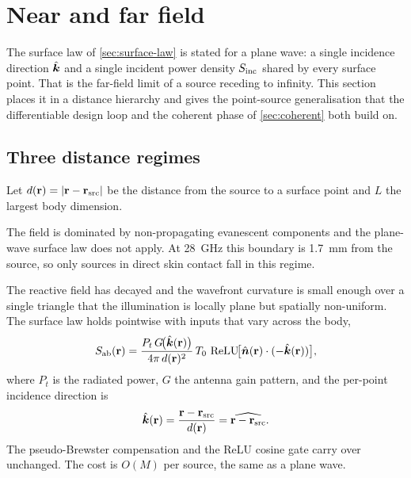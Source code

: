 \section{Near and far field}\label{sec:nearfar}

The surface law of \cref{sec:surface-law} is stated for a plane wave: a
single incidence direction $\hat{\bm{k}}$ and a single incident power density
$S_{\mathrm{inc}}$ shared by every surface point. That is the far-field limit of a
source receding to infinity. This section places it in a distance
hierarchy and gives the point-source generalisation that the
differentiable design loop and the coherent phase of \cref{sec:coherent}
both build on.

\subsection{Three distance regimes}

Let $d(\mathbf{r})=\abs{\mathbf{r}-\mathbf{r}_{\mathrm{src}}}$ be the distance from the
source to a surface point and $L$ the largest body dimension.

\begin{definition}\label{def:reactive}
The field is dominated by non-propagating evanescent components and the
plane-wave surface law does not apply. At \SI{28}{\giga\hertz} this
boundary is \SI{1.7}{\milli\metre} from the source, so only sources in
direct skin contact fall in this regime.
\end{definition}

\begin{definition}\label{def:lpw}
The reactive field has decayed and the wavefront curvature is small
enough over a single triangle that the illumination is locally plane
but spatially non-uniform. The surface law holds pointwise with inputs
that vary across the body,
\begin{equation}\label{eq:Sab-point}
  S_{\mathrm{ab}}(\mathbf{r})=\frac{P_t\,G\!\bigl(\hat{\bm{k}}(\mathbf{r})\bigr)}{4\pi\,d(\mathbf{r})^2}\,
            T_0\,\operatorname{ReLU}\!\bigl[\hat{\bm{n}}(\mathbf{r})\cdot(-\hat{\bm{k}}(\mathbf{r}))\bigr],
\end{equation}
where $P_t$ is the radiated power, $G$ the antenna gain pattern, and
the per-point incidence direction is
\begin{equation}\label{eq:khat-r}
  \hat{\bm{k}}(\mathbf{r})=\frac{\mathbf{r}-\mathbf{r}_{\mathrm{src}}}{d(\mathbf{r})}
            =\widehat{\mathbf{r}-\mathbf{r}_{\mathrm{src}}}.
\end{equation}
The pseudo-Brewster compensation and the ReLU cosine gate carry over
unchanged. The cost is $O(M)$ per source, the same as a plane wave.
\end{definition}

